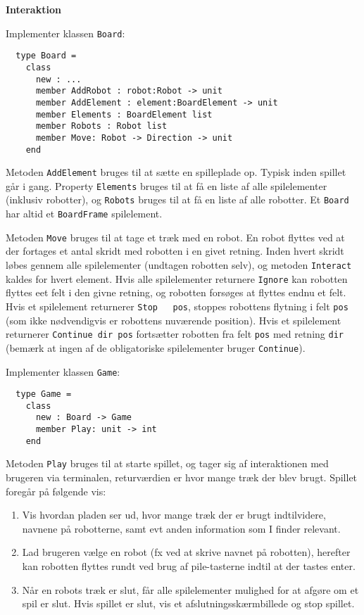 \textbf{Interaktion}

Implementer klassen \lstinline{Board}:

\begin{lstlisting}
  type Board =
    class
      new : ...
      member AddRobot : robot:Robot -> unit
      member AddElement : element:BoardElement -> unit
      member Elements : BoardElement list
      member Robots : Robot list
      member Move: Robot -> Direction -> unit
    end
\end{lstlisting}

Metoden \lstinline{AddElement} bruges til at sætte en spilleplade
op. Typisk inden spillet går i gang. Property \lstinline{Elements}
bruges til at få en liste af alle spilelementer (inklusiv robotter),
og \lstinline{Robots} bruges til at få en liste af alle robotter. Et
\lstinline{Board} har altid et \lstinline{BoardFrame} spilelement.

Metoden \lstinline{Move} bruges til at tage et træk med en robot. En
robot flyttes ved at der fortages et antal skridt med robotten i en
givet retning. Inden hvert skridt løbes gennem alle spilelementer (undtagen
robotten selv), og metoden \lstinline{Interact} kaldes for hvert
element. Hvis alle spilelementer returnere \lstinline{Ignore} kan
robotten flyttes eet felt i den givne retning, og robotten forsøges at
flyttes endnu et felt. Hvis et spilelement returnerer \lstinline{Stop
  pos}, stoppes robottens flytning i felt \lstinline{pos} (som ikke
nødvendigvis er robottens nuværende position). Hvis et spilelement
returnerer \lstinline{Continue dir pos} fortsætter robotten fra felt
\lstinline{pos} med retning \lstinline{dir} (bemærk at ingen af de
obligatoriske spilelementer bruger \lstinline{Continue}).


Implementer klassen \lstinline{Game}:

\begin{lstlisting}
  type Game =
    class
      new : Board -> Game
      member Play: unit -> int
    end
\end{lstlisting}

Metoden \lstinline{Play} bruges til at starte spillet, og tager sig af
interaktionen med brugeren via terminalen, returværdien er hvor mange
træk der blev brugt. Spillet
foregår på følgende vis:
\begin{enumerate}
 \item Vis hvordan pladen ser ud, hvor mange træk der er brugt
  indtilvidere, navnene på robotterne, samt evt anden information som
  I finder relevant.
\item Lad brugeren vælge en robot (fx ved at skrive navnet på
  robotten), herefter kan robotten flyttes rundt ved brug af
  pile-tasterne indtil at der tastes enter.

\item Når en robots træk er slut, får alle spilelementer mulighed for at
  afgøre om et spil er slut. Hvis spillet er slut, vis et
  afslutningsskærmbillede og stop spillet.
\end{enumerate}

